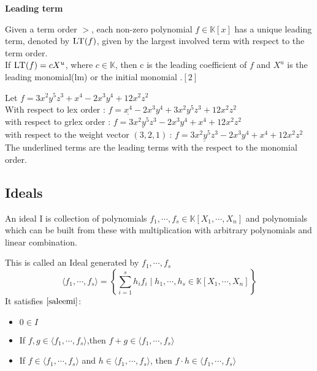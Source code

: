 \textbf{Leading term}

Given a term order $>$, each non-zero polynomial $f \in \mathbb{K}\left[ x\right] $ has a unique leading term, denoted by $\textsc{LT}(f)$, given by the largest involved term with respect to the term order.\\
If $\textsc{LT}(f) = cX^{u}$, where $c \in \mathbb{K}$, then c is the leading coefficient of $f$ and $X^{u}$ is the leading monomial(lm) or the initial monomial .$\left[ 2\right]$\\

\begin{env_example}
\normalfont Let $ f = 3x^{2}y^{5}z^{3} + x^{4} -2x^{3}y^{4} + 12x^{2}z^{2}$ \\
With respect to lex order : $f = \underline{x^{4}} -2x^{3}y^{4} + 3x^{2}y^{5}z^{3} + 12x^{2}z^{2} $ \\
with respect to grlex order : $f = \underline{3x^{2}y^{5}z^{3}} -2x^{3}y^{4} + x^{4}+ 12x^{2}z^{2}$  \\
with respect to the weight vector $\left(3,2,1\right)~$: $f = \underline{3x^{2}y^{5}z^{3}} -2x^{3}y^{4} + x^{4}+ 12x^{2}z^{2}$  \\ 
The underlined terms are the leading terms with the respect to the monomial order.

\end{env_example}


\subsection{Ideals}
\label{subsec:Ideals}

\begin{env_definition}[Ideal]
\cite{KHZ}
An ideal I is collection of polynomials $f_{1}, \cdots , f_{s} \in \mathbb{K}\left[X_{1}, \cdots, X_{n}\right] $ and polynomials which can be built from these with multiplication with arbitrary polynomials and linear combination.

\end{env_definition}
This is called an Ideal generated by $f_{1}, \cdots , f_{s}$ \\
\[ \langle f_{1}, \cdots , f_{s} \rangle = \left\lbrace  \sum_{i=1}^s h_{i}f_{i} \mid h_{1}, \cdots , h_{s} \in \mathbb{K}\left[X_{1}, \cdots, X_{n}\right] \right\rbrace \]
It satisfies $\cite{saleemi} $:
\begin{center}

\begin{itemize}
\item
$0 \in I$ 
\item
If $f,g \in \langle f_{1}, \cdots , f_{s} \rangle$,then  $f+g \in \langle f_{1}, \cdots , f_{s} \rangle$ 
\item
If $f \in \langle f_{1}, \cdots , f_{s} \rangle$ and $h \in  \langle f_{1}, \cdots , f_{s} \rangle$, then $f \cdot h \in \langle f_{1}, \cdots , f_{s} \rangle$
\end{itemize}

\end{center}

